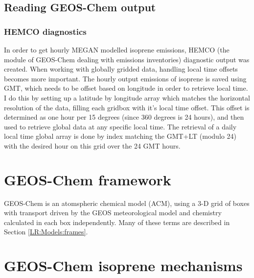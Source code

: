   \subsection{Reading GEOS-Chem output}
    
    \subsubsection{HEMCO diagnostics}
      
      In order to get hourly MEGAN modelled isoprene emissions, HEMCO (the module of GEOS-Chem dealing with emissions inventories) diagnostic output was created.
      When working with globally gridded data, handling local time offsets becomes more important.
      The hourly output emissions of isoprene is saved using GMT, which needs to be offset based on longitude in order to retrieve local time.
      I do this by setting up a latitude by longitude array which matches the horizontal resolution of the data, filling each gridbox with it's local time offset.
      This offset is determined as one hour per 15 degrees (since 360 degrees is 24 hours), and then used to retrieve global data at any specific local time.
      The retrieval of a daily local time global array is done by index matching the GMT+LT (modulo 24) with the desired hour on this grid over the 24 GMT hours.
    
\section{GEOS-Chem framework}
  \label{Model:GC_frame}
  GEOS-Chem is an atomspheric chemical model (ACM), using a 3-D grid of boxes with transport driven by the GEOS meteorological model and chemistry calculated in each box independently. 
  Many of these terms are described in Section \ref{LR:Models:frames}.



\section{GEOS-Chem isoprene mechanisms}
  \label{Model:GC_isop}
